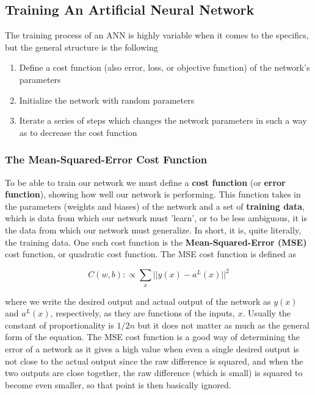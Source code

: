 \documentclass{article}
\begin{document}
\subsection{Training An Artificial Neural Network}
The training process of an ANN is highly variable when it comes to the specifics, but the general structure is the following
\begin{enumerate}
    \item Define a cost function (also error, loss, or objective function) of the network's parameters
    \item Initialize the network with random parameters
    \item Iterate a series of steps which changes the network parameters in such a way as to decrease the cost function
\end{enumerate}

\subsubsection{The Mean-Squared-Error Cost Function}

To be able to train our network we must define a \textbf{cost function} (or \textbf{error function}), 
showing how well our network is performing. This function takes in the parameters (weights and biases) of the network and a set of \textbf{training data}, which is data from which our network must 'learn', or to be less ambiguous, it is the data from which our network must generalize. In short, it is, quite literally, the training data. One such cost function is the \textbf{Mean-Squared-Error (MSE)} cost
function, or quadratic cost function. The MSE cost function is defined as

\large
\begin{equation}
    C(w, b) :\propto \sum_{x}{||y(x)-a^{L}(x)||^2}
\end{equation}
\normalsize

where we write the desired output and actual output of the network as $y(x)$ and $a^{L}(x)$, respectively, as they are functions of the inputs, $x$. Usually the constant of proportionality is $1/2n$ but it does not matter as much as the general form of the equation. The MSE cost function is a good way of determining the error of a network as it gives a high value when even a single desired output is not close to the actual output since the raw difference is squared, and when the two outputs are close together, the raw difference (which is small) is squared to become even smaller, so that point is then basically ignored.
\end{document}
